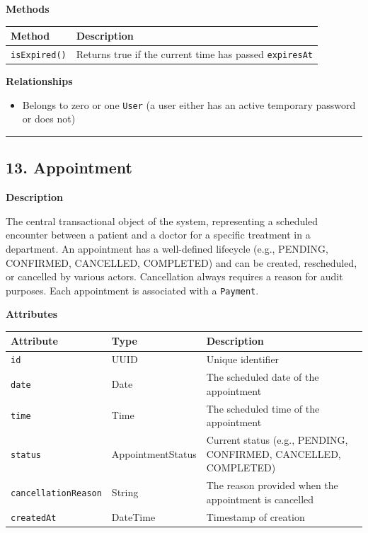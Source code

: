 \documentclass[12pt, a4paper]{article}
\begin{document}
\textbf{Methods}

\begin{center}
\small
\renewcommand{\arraystretch}{1.35}
\begin{tabularx}{\textwidth}{|M|Y|}
\hline
{}
\textbf{Method} & \textbf{Description} \\ \hline
\texttt{isExpired()} & Returns true if the current time has passed \texttt{expiresAt} \\ \hline
\end{tabularx}
\end{center}

\textbf{Relationships}

\begin{itemize}
    \item Belongs to zero or one \texttt{User} (a user either has an active temporary password or does not)
\end{itemize}

\par\medskip\hrule\medskip

\subsection{13. Appointment}\label{sec:13-appointment}

\textbf{Description}

The central transactional object of the system, representing a scheduled encounter between a patient and a doctor for a specific treatment in a department. An appointment has a well-defined lifecycle (e.g., PENDING, CONFIRMED, CANCELLED, COMPLETED) and can be created, rescheduled, or cancelled by various actors. Cancellation always requires a reason for audit purposes. Each appointment is associated with a \texttt{Payment}.

\textbf{Attributes}

\begin{center}
\small
\renewcommand{\arraystretch}{1.35}
\begin{tabularx}{\textwidth}{|>{\raggedright\arraybackslash}p{3.4cm}|>{\raggedright\arraybackslash}p{3.3cm}|Y|}
\hline
{}
\textbf{Attribute} & \textbf{Type} & \textbf{Description} \\ \hline
\texttt{id} & UUID & Unique identifier \\ \hline
\texttt{date} & Date & The scheduled date of the appointment \\ \hline
\texttt{time} & Time & The scheduled time of the appointment \\ \hline
\texttt{status} & AppointmentStatus & Current status (e.g., PENDING, CONFIRMED, CANCELLED, COMPLETED) \\ \hline
\texttt{cancellationReason} & String & The reason provided when the appointment is cancelled \\ \hline
\texttt{createdAt} & DateTime & Timestamp of creation \\ \hline
\end{tabularx}
\end{center}
\end{document}
